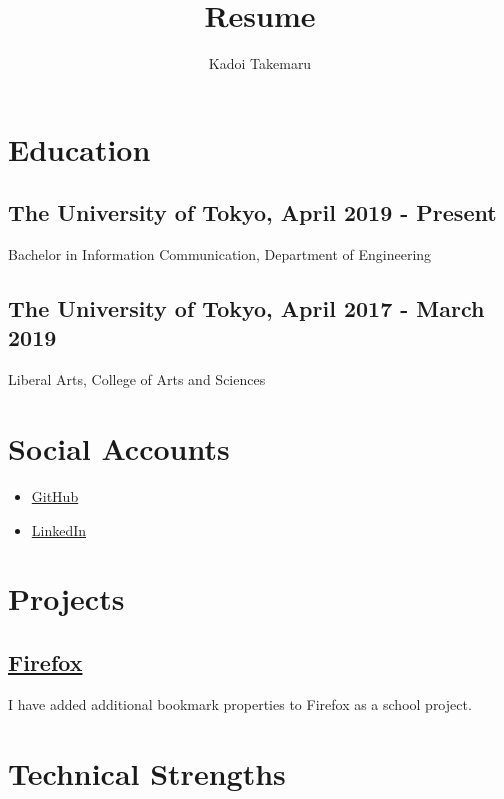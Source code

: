 \documentclass{article}
\title{Resume}
\author{Kadoi Takemaru}
\begin{document}
\maketitle

\section*{Education}
  \subsection*{The University of Tokyo, April 2019 - Present}
    Bachelor in Information Communication, Department of Engineering
  \subsection*{The University of Tokyo, April 2017 - March 2019}
    Liberal Arts, College of Arts and Sciences

\section*{Social Accounts}
  \begin{itemize}
    \item \href{https://github.com/diohabara/}{GitHub}
    \item \href{https://www.linkedin.com/in/takemaru-kadoi-6950b5172/}{LinkedIn}
  \end{itemize}

\section*{Projects}
  \subsection*{\href{https://slides.com/diohabara/deck}{Firefox}}
    I have added additional bookmark properties to Firefox as a school project.


\section*{Technical Strengths}
\end{document}
